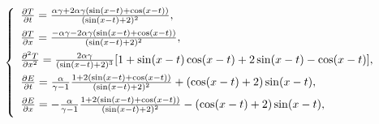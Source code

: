 \begin{equation*}\label{exact_solution_relationship2}
\left\{
\begin{array}{lllll}
\frac{\partial T}{\partial t}=\frac{\alpha\gamma+2\alpha\gamma(\sin(x-t)+\cos(x-t))}{(\sin(x-t)+2)^2},\vspace{1ex}\\
\frac{\partial T}{\partial x}=\frac{-\alpha\gamma-2\alpha\gamma(\sin(x-t)+\cos(x-t))}{(\sin(x-t)+2)^2},\vspace{1ex}\\
\frac{\partial^2 T}{\partial x^2}=\frac{2\alpha\gamma}{(\sin(x-t)+2)^3}[1+\sin(x-t)\cos(x-t)+2\sin(x-t)-\cos(x-t)],\vspace{1ex}\\
\frac{\partial E}{\partial t}=\frac{\alpha}{\gamma-1}\frac{1+2(\sin(x-t)+\cos(x-t))}{(\sin(x-t)+2)^2}+(\cos(x-t)+2)\sin(x-t),\vspace{1ex}\\
\frac{\partial E}{\partial x}=-\frac{\alpha}{\gamma-1}\frac{1+2(\sin(x-t)+\cos(x-t))}{(\sin(x-t)+2)^2}-(\cos(x-t)+2)\sin(x-t),\vspace{1ex}\\
\end{array}
\right.
\end{equation*}

